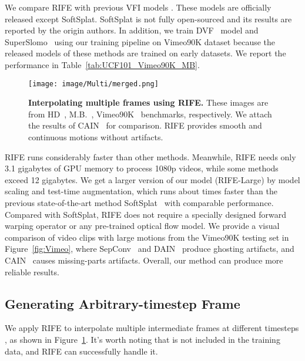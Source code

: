 \documentclass[final]{cvpr}
\begin{document}
We compare RIFE with previous VFI models  \cite{xue2019video, Niklaus_ICCV_2017, bao2019memc, bao2019depth, choi2020channel, niklaus2020softmax, park2020bmbc, cheng2020video, lee2020adacof, ding2021cdfi, cheng2020multiple}. These models are officially released except SoftSplat. SoftSplat is not fully open-sourced and its results are reported by the origin authors. In addition, we train DVF~\cite{liu2017video} model and SuperSlomo~\cite{jiang2018super} using our training pipeline on Vimeo90K dataset because the released models of these methods are trained on early datasets. We report the performance in Table~\ref{tab:UCF101_Vimeo90K_MB}.

\begin{figure}[t]
	\centering
	\texttt{[image: image/Multi/merged.png]}
	\caption{\textbf{Interpolating multiple frames using RIFE.} These images are from HD~\cite{bao2019depth}, M.B.~\cite{baker2011database}, Vimeo90K~\cite{xue2019video} benchmarks, respectively. We attach the results of CAIN~\cite{choi2020channel} for comparison. RIFE provides smooth and continuous motions without artifacts.}\label{fig:multi}
\end{figure}

RIFE runs considerably faster than other methods. Meanwhile, RIFE needs only 3.1 gigabytes of GPU memory to process 1080p videos, while some methods exceed 12 gigabytes. We get a larger version of our model (RIFE-Large) by model scaling and test-time augmentation, which runs about  times faster than the previous state-of-the-art method SoftSplat~\cite{niklaus2020softmax} with comparable performance. Compared with SoftSplat, RIFE does not require a specially designed forward warping operator or any pre-trained optical flow model. We provide a visual comparison of video clips with large motions from the Vimeo90K testing set in Figure~\ref{fig:Vimeo}, where SepConv~\cite{Niklaus_ICCV_2017} and DAIN~\cite{bao2019depth} produce ghosting artifacts, and CAIN~\cite{choi2020channel} causes missing-parts artifacts. Overall, our method can produce more reliable results.

\subsection{Generating Arbitrary-timestep Frame}
\label{sec:model_multi}
We apply RIFE to interpolate multiple intermediate frames at different timesteps , as shown in Figure~\ref{fig:multi}. It's worth noting that  is not included in the training data, and RIFE can successfully handle it.
\end{document}

